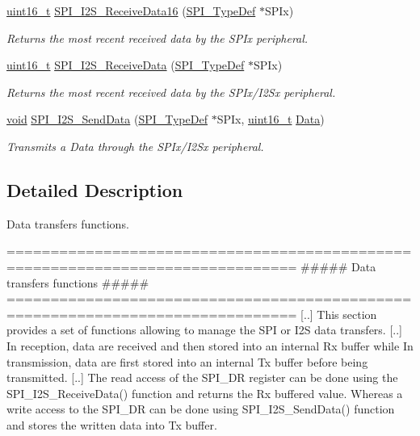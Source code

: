 \begin{DoxyCompactItemize}
\hyperlink{stdint_8h_a273cf69d639a59973b6019625df33e30}{uint16\-\_\-t} \hyperlink{group___s_p_i___group2_ga1920d9529f224dec9b83eec969e2597d}{S\-P\-I\-\_\-\-I2\-S\-\_\-\-Receive\-Data16} (\hyperlink{struct_s_p_i___type_def}{S\-P\-I\-\_\-\-Type\-Def} $\ast$S\-P\-Ix)
\begin{DoxyCompactList}\small\item\em Returns the most recent received data by the S\-P\-Ix peripheral. \end{DoxyCompactList}\item 
\hyperlink{stdint_8h_a273cf69d639a59973b6019625df33e30}{uint16\-\_\-t} \hyperlink{group___s_p_i___group2_gab77de76547f3bff403236b263b070a30}{S\-P\-I\-\_\-\-I2\-S\-\_\-\-Receive\-Data} (\hyperlink{struct_s_p_i___type_def}{S\-P\-I\-\_\-\-Type\-Def} $\ast$S\-P\-Ix)
\begin{DoxyCompactList}\small\item\em Returns the most recent received data by the S\-P\-Ix/\-I2\-Sx peripheral. \end{DoxyCompactList}\item 
\hyperlink{group___n_a_m_e_ga18028b8badbf1ea7e704ccac3c488e82}{void} \hyperlink{group___s_p_i___group2_gad5af40bebe8dbe3fa8bd476489d7e3da}{S\-P\-I\-\_\-\-I2\-S\-\_\-\-Send\-Data} (\hyperlink{struct_s_p_i___type_def}{S\-P\-I\-\_\-\-Type\-Def} $\ast$S\-P\-Ix, \hyperlink{stdint_8h_a273cf69d639a59973b6019625df33e30}{uint16\-\_\-t} \hyperlink{group___copter_control_b_l_ga6f3335509cc4943e20df66f72483910c}{Data})
\begin{DoxyCompactList}\small\item\em Transmits a Data through the S\-P\-Ix/\-I2\-Sx peripheral. \end{DoxyCompactList}\end{DoxyCompactItemize}


\subsection{Detailed Description}
Data transfers functions. \begin{DoxyVerb} ===============================================================================
                    ##### Data transfers functions #####
 ===============================================================================  
    [..] This section provides a set of functions allowing to manage the SPI or I2S 
         data transfers.
    [..] In reception, data are received and then stored into an internal Rx buffer while 
         In transmission, data are first stored into an internal Tx buffer before being 
         transmitted.
    [..] The read access of the SPI_DR register can be done using the SPI_I2S_ReceiveData()
         function and returns the Rx buffered value. Whereas a write access to the SPI_DR 
         can be done using SPI_I2S_SendData() function and stores the written data into 
         Tx buffer.\end{DoxyVerb}


